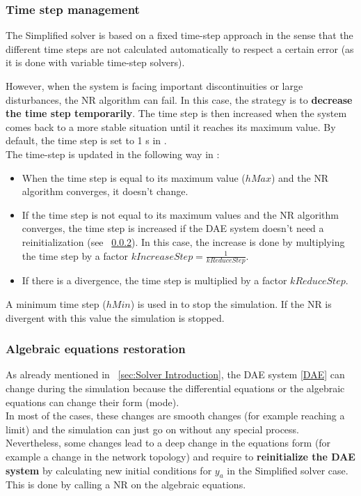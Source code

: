 \documentclass[a4paper, 12pt]{report}
\begin{document}
\subsubsection{Time step management}

The Simplified solver is based on a fixed time-step approach in the sense that the different time steps are not calculated automatically to respect a certain error (as it is done with variable time-step solvers).

However, when the system is facing important discontinuities or large disturbances, the \ac{NR} algorithm can fail. In this case, the strategy is to \textbf{decrease the time step temporarily}. The time step is then increased when the system comes back to a more stable situation until it reaches its maximum value. By default, the time step is set to 1 s in \Dynawo. \\

The time-step is updated in the following way in \Dynawo:
\begin{itemize}
\item When the time step is equal to its maximum value ($hMax$) and the \ac{NR} algorithm converges, it doesn't change.
\item If the time step is not equal to its maximum values and the \ac{NR} algorithm converges, the time step is increased if the \ac{DAE} system doesn't need a reinitialization (see ~\ref{sec:AERestoration}). In this case, the increase is done by multiplying the time step by a factor $kIncreaseStep = \frac{1}{kReduceStep}$.
\item If there is a divergence, the time step is multiplied by a factor $kReduceStep$.
\end{itemize}
A minimum time step ($hMin$) is used in \Dynawo to stop the simulation. If the \ac{NR} is divergent with this value the simulation is stopped. \\

\subsubsection{Algebraic equations restoration}
\label{sec:AERestoration}

As already mentioned in ~\ref{sec:Solver Introduction}, the \ac{DAE} system \eqref{DAE} can change during the simulation because the differential equations or the algebraic equations can change their form (mode). \\

In most of the cases, these changes are smooth changes (for example reaching a limit) and the simulation can just go on without any special process. Nevertheless, some changes lead to a deep change in the  equations form (for example a change in the network topology) and require to \textbf{reinitialize the \ac{DAE} system} by calculating new initial conditions for $y_a$ in the Simplified solver case.
This is done by calling a \ac{NR} on the algebraic equations.
\end{document}
